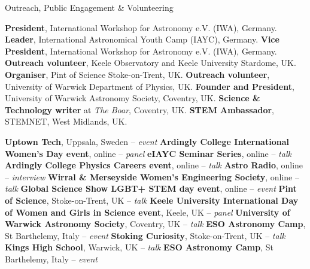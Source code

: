 \begin{rubric}{Outreach, Public Engagement \& Volunteering }

\entry*[2023 -- 2024]%
    \textbf{President}, International Workshop for Astronomy e.V. (IWA), Germany.
\entry*[2017 -- 2024]%
    \textbf{Leader}, International Astronomical Youth Camp (IAYC), Germany. 
\entry*[2021 -- 2023]%
    \textbf{Vice President}, International Workshop for Astronomy e.V. (IWA), Germany. 
\entry*[2019 -- 2022]%
    \textbf{Outreach volunteer}, Keele Observatory and Keele University Stardome, UK.
\entry*[2019 -- 2020]%
    \textbf{Organiser}, Pint of Science Stoke-on-Trent, UK.
\entry*[2017 -- 2018]%
    \textbf{Outreach volunteer}, University of Warwick Department of Physics, UK. 
\entry*[2016 -- 2018]%
    \textbf{Founder and President}, University of Warwick Astronomy Society, Coventry, UK.
\entry*[2016 -- 2018]%
    \textbf{Science \& Technology writer} at \textit{The Boar}, Coventry, UK.
\entry*[2016 -- 2018]%
    \textbf{STEM Ambassador}, STEMNET, West Midlands, UK.

\entry*[2024]%
    \textbf{Uptown Tech}, Uppsala, Sweden -- \textit{event}
\entry*[2022]%
    \textbf{Ardingly College International Women's Day event}, online -- \textit{panel}
\entry*[2021]%
    \textbf{eIAYC Seminar Series}, online -- \textit{talk}
\entry*[2021]%
    \textbf{Ardingly College Physics Careers event}, online -- \textit{talk}
\entry*[2021]%
    \textbf{Astro Radio}, online -- \textit{interview}
\entry*[2020]%
    \textbf{Wirral \& Merseyside Women's Engineering Society}, online -- \textit{talk}  
\entry*[2020]%
    \textbf{Global Science Show LGBT+ STEM day event}, online -- \textit{event}  
\entry*[2019]%
    \textbf{Pint of Science}, Stoke-on-Trent, UK -- \textit{talk} 
\entry*[2019]%
    \textbf{Keele University International Day of Women and Girls in Science event}, Keele, UK -- \textit{panel} 
\entry*[2019]%
    \textbf{University of Warwick Astronomy Society}, Coventry, UK -- \textit{talk} 
\entry*[2018]%
    \textbf{ESO Astronomy Camp}, St Barthelemy, Italy -- \textit{event}
\entry*[2018]%
    \textbf{Stoking Curiosity}, Stoke-on-Trent, UK -- \textit{talk}
\entry*[2018]%
    \textbf{Kings High School}, Warwick, UK -- \textit{talk} 
\entry*[2017]%
    \textbf{ESO Astronomy Camp}, St Barthelemy, Italy -- \textit{event}
    
\end{rubric}